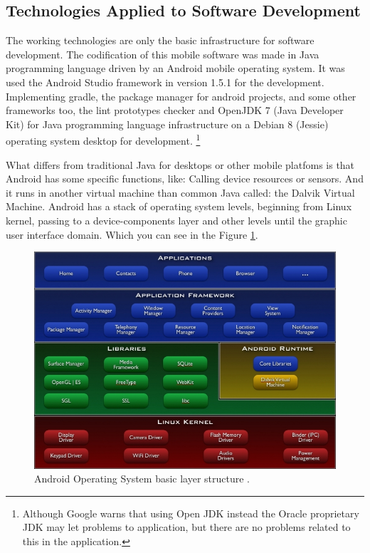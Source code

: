 \subsection{Technologies Applied to Software Development}
		
The working technologies are only the basic infrastructure for software development. The codification of this mobile software was made in Java programming language driven by an Android mobile operating system. It was used the Android Studio framework in version 1.5.1 for the development. Implementing gradle, the package manager for android projects, and some other frameworks too, the lint prototypes checker and OpenJDK 7 (Java Developer Kit) for Java programming language infrastructure on a Debian 8 (Jessie) operating system desktop for development. \footnote{Although Google warns that using Open JDK instead the Oracle proprietary JDK may let problems to application, but there are no problems related to this in the application.} 
		
What differs from traditional Java for desktops or other mobile platfoms is that Android has some specific functions, like: Calling device resources or sensors.  And it runs in another virtual machine than common Java called: the Dalvik Virtual Machine. Android has a stack of operating system levels, beginning from Linux kernel, passing to a device-components layer and other levels until the graphic user interface domain. Which you can see in the Figure \ref{android}.
		
		\begin{figure}[htp]
			\begin{center}
				\includegraphics[scale=0.65]{chapters/desenvolvimento/img/android.jpeg}
				\caption{Android Operating System basic layer structure \citep{1_fundamentals_2015}.}
				\label{android}
			\end{center}
		\end{figure}
		
